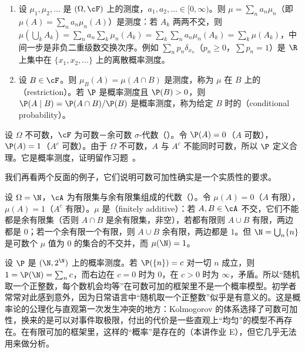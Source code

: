 \begin{example}[测度的非负线性组合与限制]\label{ex:measures:combination}
\begin{enumerate}
\item 设 $\mu_1,\mu_2,\dots$ 是 $(\Omega,\cF)$ 上的测度，$a_1,a_2,\dots\in[0,\infty)$。则 $\mu=\sum_na_n\mu_n$（即 $\mu(A)=\sum_na_n\mu_n(A)$）是测度：若 $A_k$ 两两不交，则 $\mu(\bigcup_kA_k)=\sum_na_n\sum_k\mu_n(A_k)=\sum_k\sum_na_n\mu_n(A_k)=\sum_k\mu(A_k)$，中间一步是非负二重级数交换次序。例如 $\sum_np_n\delta_{x_n}$（$p_n\geqslant0$，$\sum p_n=1$）是 $\R$ 上集中在 $\{x_1,x_2,\dots\}$ 上的离散概率测度。
\item 设 $B\in\cF$。则 $\mu_B(A)=\mu(A\cap B)$ 是测度，称为 $\mu$ 在 $B$ 上的（restriction）。若 $\P$ 是概率测度且 $\P(B)>0$，则 $\P(A\mid B)=\P(A\cap B)/\P(B)$ 是概率测度，称为给定 $B$ 时的（conditional probability）。
\end{enumerate}
\end{example}

\begin{example}[$0$-$1$ 测度]\label{ex:measures:zero-one}
设 $\Omega$ 不可数，$\cF$ 为可数－余可数 $\sigma$-代数（）。令 $\P(A)=0$（$A$ 可数），$\P(A)=1$（$A^c$ 可数）。由于 $\Omega$ 不可数，$A$ 与 $A^c$ 不能同时可数，所以 $\P$ 定义合理。它是概率测度，证明留作习题~。
\end{example}

我们再看两个反面的例子，它们说明可数可加性确实是一个实质性的要求。

\begin{example}[有限可加但不可数可加]\label{ex:measures:finitely-additive}
设 $\Omega=\N$，$\cA$ 为有限集与余有限集组成的代数（）。令 $\mu(A)=0$（$A$ 有限），$\mu(A)=1$（$A^c$ 有限）。$\mu$ 是（finitely additive）：若 $A,B\in\cA$ 不交，它们不能都是余有限集（否则 $A\cap B$ 是余有限集，非空），若都有限则 $A\cup B$ 有限，两边都是 $0$；若一个余有限一个有限，则 $A\cup B$ 余有限，两边都是 $1$。但 $\N=\bigcup_n\{n\}$ 是可数个 $\mu$ 值为 $0$ 的集合的不交并，而 $\mu(\N)=1$。
\end{example}

\begin{example}
设 $\P$ 是 $(\N,2^\N)$ 上的概率测度。若 $\P(\{n\})=c$ 对一切 $n$ 成立，则 $1=\P(\N)=\sum_nc$，而右边在 $c=0$ 时为 $0$，在 $c>0$ 时为 $\infty$，矛盾。所以“随机取一个正整数，每个数机会均等”在可数可加的框架里不是一个概率模型。初学者常常对此感到意外，因为日常语言中“随机取一个正整数”似乎是有意义的。这是概率论的公理化与直观第一次发生冲突的地方：Kolmogorov 的体系选择了可数可加性，换来的是可以对事件取极限，付出的代价是一些直观上“均匀”的模型不再存在。在有限可加的框架里，这样的“概率”是存在的（本讲作业 E），但它几乎无法用来做分析。
\end{example}

